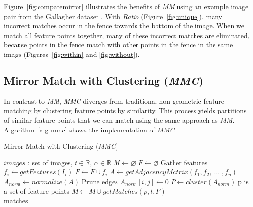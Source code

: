 Figure~\ref{fig:comparemirror} illustrates the benefits of \emph{MM} 
using an example image pair from the Gallagher dataset 
\cite{gallagher2008}.
With \emph{Ratio} (Figure~\ref{fig:unique}), many incorrect matches occur 
in the fence towards the bottom of the image.
When we match all feature points together, many of these incorrect 
matches are eliminated, because points in the fence match with other 
points in the fence in the same image (Figures~\ref{fig:within} and
\ref{fig:without}).


\subsection{Mirror Match with Clustering (\emph{MMC})}

In contrast to \emph{MM}, \emph{MMC} diverges from traditional 
non-geometric feature matching by clustering feature points by 
similarity. This process yields partitions of similar feature points 
that we can match using the same approach as \emph{MM}.  
Algorithm~\ref{alg-mmc} shows the implementation of \emph{MMC}.

\begin{algorithm}[htb]
\caption{Mirror Match with Clustering (\emph{MMC})}
\label{alg-mmc}
\begin{algorithmic}
\Require $images$ : set of images, $t \in \mathbb{R}$, $\alpha \in 
\mathbb{R}$
\State $M\gets \varnothing$
\State $F\gets \varnothing$
 \Comment Gather features
	\State $f_i\gets getFeatures(I_i)$
	\State $F\gets F \cup f_i$
\EndFor
\State $A\gets getAdjacencyMatrix(f_1, f_2,\; \ldots \;, f_n)$
\State $A_{norm}\gets normalize(A)$
 \Comment Prune edges
        \State $A_{norm}[i,j] \gets 0$
    \EndIf
\EndFor
\State $P\gets cluster(A_{norm})$
 \Comment p is a set of feature points
	\State $M\gets M \cup getMatches(p, t, F)$
\EndFor \\
\Return matches
\end{algorithmic}
\end{algorithm}

